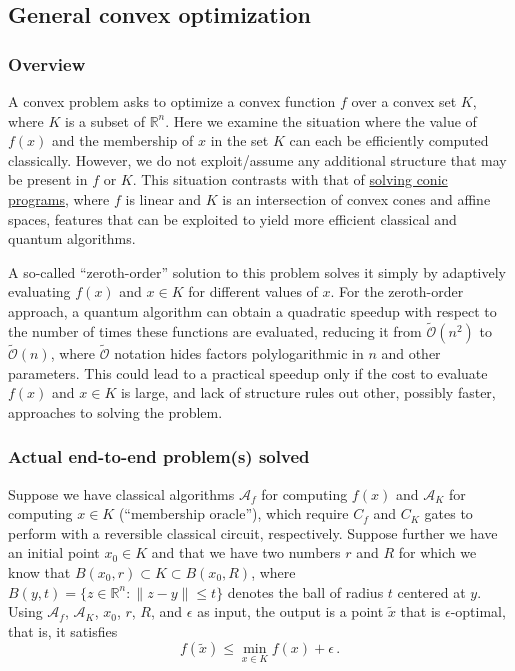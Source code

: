 \begin{refsection}
\subsection{General convex optimization  }\label{appl:GeneralConvexOpt}

\subsubsection*{Overview}

A convex problem asks to optimize a convex function $f$ over a convex set $K$, where $K$ is a subset of $\mathbb{R}^n$. Here we examine the situation where the value of $f(x)$ and the membership of $x$ in the set $K$ can each be efficiently computed classically. However, we do not exploit/assume any additional structure that may be present in $f$ or $K$. This situation contrasts with that of \hyperref[appl:ConicProgramming]{solving conic programs}, where $f$ is linear and $K$ is an intersection of convex cones and affine spaces, features that can be exploited to yield more efficient classical and quantum algorithms.  

A so-called ``zeroth-order'' solution to this problem solves it simply by adaptively evaluating $f(x)$ and $x \in K$ for different values of $x$. For the zeroth-order approach, a quantum algorithm can obtain a quadratic speedup with respect to the number of times these functions are evaluated, reducing it from $\tilde{\mathcal{O}}(n^2)$ to $\tilde{\mathcal{O}}(n)$, where $\tilde{\mathcal{O}}$ notation hides factors polylogarithmic in $n$  and other parameters. This could lead to a practical speedup only if the cost to evaluate $f(x)$ and $x\in K$ is large, and lack of structure rules out other, possibly faster, approaches to solving the problem. 

\subsubsection*{Actual end-to-end problem(s) solved}

Suppose we have classical algorithms $\mathcal{A}_f$ for computing $f(x)$ and $\mathcal{A}_K$ for computing $x \in K$ (``membership oracle''), which require $C_f$ and $C_K$ gates to perform with a reversible classical circuit, respectively. Suppose further we have an initial point $x_0 \in K$ and that we have two numbers $r$ and $R$ for which we know that $B(x_0,r) \subset K \subset B(x_0,R)$, where $B(y,t) = \{z \in \mathbb{R}^n: \lVert z-y \rVert \leq t\}$ denotes the ball of radius $t$ centered at $y$. Using $\mathcal{A}_f$, $\mathcal{A}_K$, $x_0$, $r$, $R$, and $\epsilon$ as input, the output is a point $\tilde{x}$ that is $\epsilon$-optimal, that is, it satisfies
\begin{equation}
    f(\tilde{x}) \leq \min_{x \in K}f(x) + \epsilon\,.
\end{equation}


\end{refsection}
